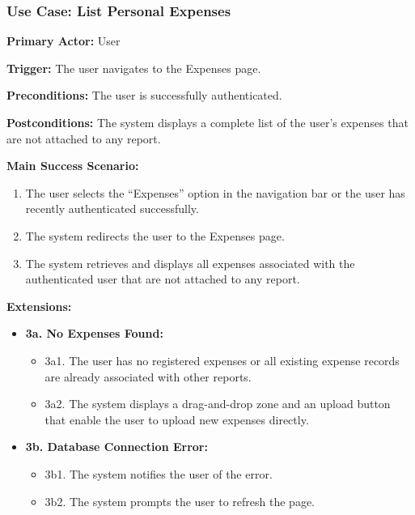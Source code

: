 \subsubsection{\textbf{Use Case: List Personal Expenses}}

\textbf{Primary Actor:} User

\textbf{Trigger:} The user navigates to the Expenses page.

\textbf{Preconditions:} The user is successfully authenticated.

\textbf{Postconditions:} The system displays a complete list of the user’s expenses that are not attached to any report.

\vspace{0.5cm}

\textbf{Main Success Scenario:}

\begin{enumerate} [leftmargin=0.75cm, noitemsep]
    \item The user selects the “Expenses” option in the navigation bar or the user has recently authenticated successfully.
    \item The system redirects the user to the Expenses page.
    \item The system retrieves and displays all expenses associated with the authenticated user that are not attached to any report.
\end{enumerate}

\vspace{0.3cm}

\textbf{Extensions:}

\begin{itemize} [label={}, leftmargin=0.75cm, noitemsep]
    \item \textbf{3a. No Expenses Found:}
    \begin{itemize} [label={}, leftmargin=0.75cm, noitemsep]
        \item 3a1. The user has no registered expenses or all existing expense records are already associated with other reports.
        \item 3a2. The system displays a drag-and-drop zone and an upload button that enable the user to upload new expenses directly.
    \end{itemize}

    \item \textbf{3b. Database Connection Error:}
    \begin{itemize} [label={}, leftmargin=0.75cm, noitemsep]
        \item 3b1. The system notifies the user of the error.
        \item 3b2. The system prompts the user to refresh the page.
    \end{itemize}
\end{itemize}